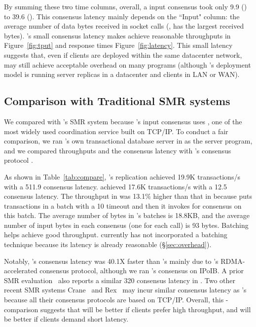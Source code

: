 By summing these two time columns, overall, a \xxx input consensus took only 
9.9 \us (\redis) to 39.6 \us (\mongodb). This consensus latency mainly depends 
on the ``Input" column: the average number of data bytes received in socket 
calls (\eg, \mongodb has the largest received bytes). \xxx's small consensus 
latency makes \xxx achieve reasonable throughputs in Figure~\ref{fig:tput} and 
response times Figure~\ref{fig:latency}. This small latency suggests that, even 
if clients are deployed within the same datacenter network, \xxx may still 
achieve acceptable overhead on many programs (although \xxx's deployment 
model is running server replicas in a datacenter and clients in LAN 
or WAN).

\subsection{Comparison with Traditional SMR systems} \label{sec:compare}

We compared \xxx with \calvin's SMR system because \calvin's input consensus 
uses \zookeeper, one of the most widely used coordination service built on 
TCP/IP. To conduct a fair comparison, we ran \calvin's own transactional 
database server in \xxx as the server program, and we compared throughputs and 
the consensus latency with \calvin's consensus protocol \zookeeper.

As shown in Table~\ref{tab:compare}, \calvin's \zookeeper replication achieved 
19.9K transactions/s with a 511.9 \us consensus latency. \xxx achieved 17.6K 
transactions/s with a 12.5 \us consensus latency. The throughput in \calvin 
was 13.1\% higher than that in \xxx because \calvin puts transactions in a 
batch with a 10 \ms timeout and then it invokes \zookeeper for consensus on 
this batch. The average number of bytes in \calvin's batches is 18.8KB, and 
the average number of input bytes in each \xxx consensus (one for each \myread 
call) is 93 bytes. Batching helps \calvin achieve good throughput. \xxx 
currently has not incorporated a batching technique because its latency is 
already reasonable (\S\ref{sec:overhead}).

Notably, \xxx's consensus latency was 40.1X faster than \zookeeper's mainly due 
to \xxx's RDMA-accelerated consensus protocol, although we ran \calvin's 
\zookeeper consensus on IPoIB. A prior SMR evaluation~\cite{dare:hpdc15} also 
reports a similar 320 \us consensus latency in \zookeeper. Two other recent SMR 
systems Crane~\cite{crane:sosp15} and Rex~\cite{rex:eurosys14} may incur similar 
consensus latency as \zookeeper's because all their consensus protocols are 
based on TCP/IP. Overall, this \xxx-\calvin comparison suggests that \calvin 
will be better if clients prefer high throughput, and \xxx will be better if 
clients demand short latency.

